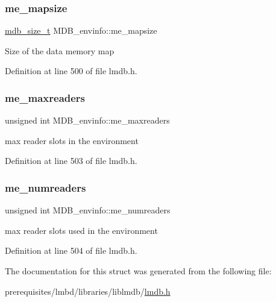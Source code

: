 \subsubsection{\texorpdfstring{me\+\_\+mapsize}{me\_mapsize}}
{\footnotesize\ttfamily \mbox{\hyperlink{lmdb_8h_a78821971e612e3898ef4b3ae45ed86f1}{mdb\+\_\+size\+\_\+t}} M\+D\+B\+\_\+envinfo\+::me\+\_\+mapsize}

Size of the data memory map 

Definition at line 500 of file lmdb.\+h.

\mbox{\label{struct_m_d_b__envinfo_a0a55ab3e5584ea6bb51caec3516e134b}} 
\subsubsection{\texorpdfstring{me\+\_\+maxreaders}{me\_maxreaders}}
{\footnotesize\ttfamily unsigned int M\+D\+B\+\_\+envinfo\+::me\+\_\+maxreaders}

max reader slots in the environment 

Definition at line 503 of file lmdb.\+h.

\mbox{\label{struct_m_d_b__envinfo_af20468962fceb98d99e15c314955e290}} 
\subsubsection{\texorpdfstring{me\+\_\+numreaders}{me\_numreaders}}
{\footnotesize\ttfamily unsigned int M\+D\+B\+\_\+envinfo\+::me\+\_\+numreaders}

max reader slots used in the environment 

Definition at line 504 of file lmdb.\+h.



The documentation for this struct was generated from the following file\+:\begin{DoxyCompactItemize}
\item 
prerequisites/lmbd/libraries/liblmdb/\mbox{\hyperlink{lmdb_8h}{lmdb.\+h}}\end{DoxyCompactItemize}
